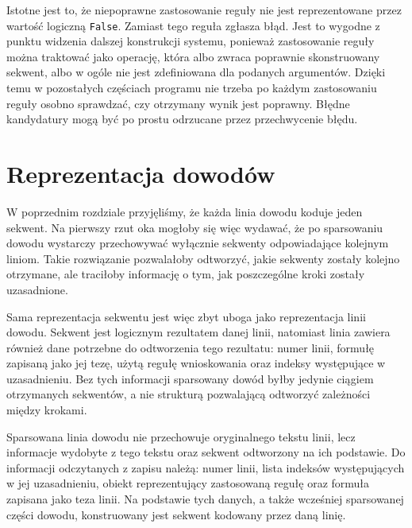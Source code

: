 \documentclass[shortabstract]{iithesis}
\theoremstyle{definition}
\theoremstyle{remark}
\theoremstyle{plain}
\begin{document}
Istotne jest to, że niepoprawne zastosowanie reguły nie jest reprezentowane przez
wartość logiczną \texttt{False}. Zamiast tego reguła zgłasza błąd. Jest to wygodne
z punktu widzenia dalszej konstrukcji systemu, ponieważ zastosowanie reguły można
traktować jako operację, która albo zwraca poprawnie skonstruowany sekwent, albo
w ogóle nie jest zdefiniowana dla podanych argumentów. Dzięki temu w pozostałych
częściach programu nie trzeba po każdym zastosowaniu reguły osobno sprawdzać,
czy otrzymany wynik jest poprawny. Błędne kandydatury mogą być po prostu
odrzucane przez przechwycenie błędu.

\section{Reprezentacja dowodów}
\label{sec:Reprezentacja dowodów}
W poprzednim rozdziale przyjęliśmy, że każda linia dowodu koduje jeden sekwent.
Na pierwszy rzut oka mogłoby się więc wydawać, że po sparsowaniu dowodu wystarczy
przechowywać wyłącznie sekwenty odpowiadające kolejnym liniom. Takie rozwiązanie
pozwalałoby odtworzyć, jakie sekwenty zostały kolejno otrzymane, ale traciłoby
informację o tym, jak poszczególne kroki zostały uzasadnione.

Sama reprezentacja sekwentu jest więc zbyt uboga jako reprezentacja linii dowodu.
Sekwent jest logicznym rezultatem danej linii, natomiast linia zawiera również dane
potrzebne do odtworzenia tego rezultatu: numer linii, formułę zapisaną jako jej tezę,
użytą regułę wnioskowania oraz indeksy występujące w uzasadnieniu. Bez tych
informacji sparsowany dowód byłby jedynie ciągiem otrzymanych sekwentów, a nie
strukturą pozwalającą odtworzyć zależności między krokami.

Sparsowana linia dowodu nie przechowuje oryginalnego tekstu linii, lecz informacje
wydobyte z tego tekstu oraz sekwent odtworzony na ich podstawie. Do informacji
odczytanych z zapisu należą: numer linii, lista indeksów występujących w jej
uzasadnieniu, obiekt reprezentujący zastosowaną regułę oraz formuła zapisana jako
teza linii. Na podstawie tych danych, a także wcześniej sparsowanej części dowodu,
konstruowany jest sekwent kodowany przez daną linię.
\end{document}

